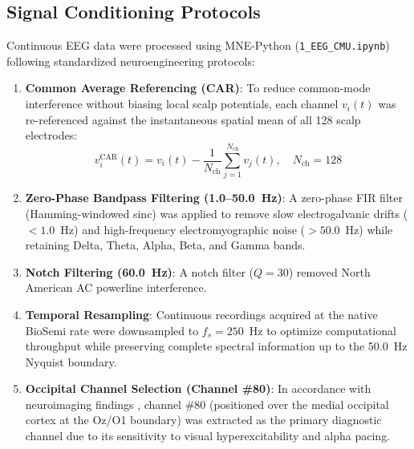 \documentclass[12pt, a4paper]{report}
\begin{document}
\subsection{Signal Conditioning Protocols}
Continuous EEG data were processed using MNE-Python (\texttt{1\_EEG\_CMU.ipynb}) following standardized neuroengineering protocols:
\begin{enumerate}
    \item \textbf{Common Average Referencing (CAR)}: To reduce common-mode interference without biasing local scalp potentials, each channel $v_i(t)$ was re-referenced against the instantaneous spatial mean of all 128 scalp electrodes:
    \begin{equation}
        v_i^{\text{CAR}}(t) = v_i(t) - \frac{1}{N_{\text{ch}}} \sum_{j=1}^{N_{\text{ch}}} v_j(t), \quad N_{\text{ch}} = 128
        \label{eq:car_reference}
    \end{equation}
    \item \textbf{Zero-Phase Bandpass Filtering (1.0--50.0~Hz)}: A zero-phase FIR filter (Hamming-windowed sinc) was applied to remove slow electrogalvanic drifts ($<1.0$~Hz) and high-frequency electromyographic noise ($>50.0$~Hz) while retaining Delta, Theta, Alpha, Beta, and Gamma bands.
    \item \textbf{Notch Filtering (60.0~Hz)}: A notch filter ($Q = 30$) removed North American AC powerline interference.
    \item \textbf{Temporal Resampling}: Continuous recordings acquired at the native BioSemi rate were downsampled to $f_s = 250$~Hz to optimize computational throughput while preserving complete spectral information up to the 50.0~Hz Nyquist boundary.
    \item \textbf{Occipital Channel Selection (Channel \#80)}: In accordance with neuroimaging findings \cite{chamanzar2021uhd,orhanbulucu2023hybrid}, channel \#80 (positioned over the medial occipital cortex at the Oz/O1 boundary) was extracted as the primary diagnostic channel due to its sensitivity to visual hyperexcitability and alpha pacing.
\end{enumerate}
\end{document}
